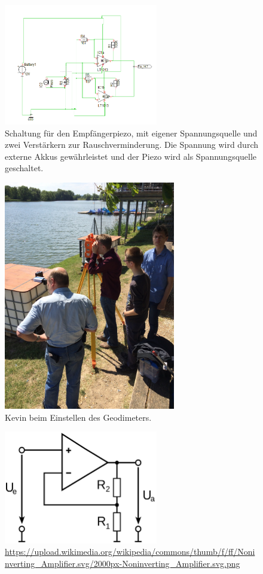\documentclass[12pt,a4paper,titlepage,headinclude,bibtotoc]{scrartcl}
\numberwithin{equation}{subsection}
\begin{document}
\begin{figure}[!h]
\centering
\includegraphics[width=0.6\textwidth]{Fotos/Echoverstaerker.png}
\caption{Schaltung für den Empfängerpiezo, mit eigener Spannungsquelle und zwei Verstärkern zur Rauschverminderung. Die Spannung wird durch externe Akkus gewährleistet und der Piezo wird als Spannungsquelle geschaltet.}
\label{fig:Echoverstaerker}
\end{figure}



\begin{figure}[h]
	\centering
	\includegraphics[height=10cm]{Geodimeter.jpg}
	\caption{Kevin beim Einstellen des Geodimeters.}
	\label{fig:geodimeter}
\end{figure}


\begin{figure}[h]
	\centering
	\includegraphics[width=0.6\textwidth]{nicht.png}
	\caption{\url{https://upload.wikimedia.org/wikipedia/commons/thumb/f/ff/Noninverting_Amplifier.svg/2000px-Noninverting_Amplifier.svg.png}}
	\label{fig:nicht}
\end{figure}
\end{document}

